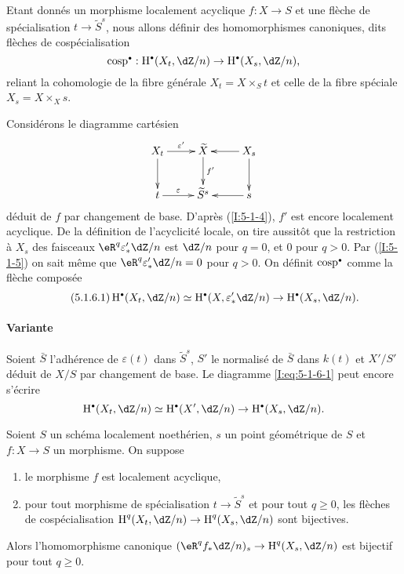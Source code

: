 \subsubsection{}\label{I:5-1-6}

Etant donnés un morphisme localement acyclique $f:X\to S$ et une flèche de 
spécialisation $t\to \widetilde S^s$, nous allons définir des 
homomorphismes canoniques, dits flèches de cospécialisation 
\[
  \cosp^\bullet : \h^\bullet(X_t,\dZ/n) \to \h^\bullet(X_s,\dZ/n)\text{,}
\]
reliant la cohomologie de la fibre générale $X_t=X\times_S t$ et celle de la 
fibre spéciale $X_s=X\times_X s$. 

Considérons le diagramme cartésien 
\[\xymatrix{
  X_t \ar[d] \ar[r]^-{\varepsilon'} 
    & \widetilde X \ar[d]^-{f'} 
    & \ar[l] X_s \ar[d] \\
  t \ar[r]^-\varepsilon 
    & \widetilde S^s 
    & \ar[l] s
}\]
déduit de $f$ par changement de base. D'après (\ref{I:5-1-4}), $f'$ est encore 
localement acyclique. De la définition de l'acyclicité locale, on tire 
aussitôt que la restriction à $X_s$ des faisceaux $\eR^q \varepsilon_*' \dZ/n$ 
est $\dZ/n$ pour $q=0$, et $0$ pour $q>0$. Par (\ref{I:5-1-5}) on sait même que 
$\eR^q \varepsilon_*'\dZ/n = 0$ pour $q>0$. On définit $\cosp^\bullet$ comme la 
flèche composée 
\begin{equation*}\tag{5.1.6.1}\label{I:eq:5-1-6-1}
  \h^\bullet(X_t,\dZ/n) \simeq \h^\bullet(X,\varepsilon_*' \dZ/n) \to \h^\bullet(X_s,\dZ/n) \text{.}
\end{equation*}

\paragraph{Variante}
Soient $\bar S$ l'adhérence de $\varepsilon(t)$ dans $\widetilde S^s$, $S'$ le 
normalisé de $\bar S$ dans $k(t)$ et $X'/S'$ déduit de $X/S$ par changement 
de base. Le diagramme \eqref{I:eq:5-1-6-1} peut encore s'écrire 
\[
  \h^\bullet(X_t,\dZ/n) \simeq \h^\bullet(X',\dZ/n) \to \h^\bullet(X_s,\dZ/n) \text{.}
\]





\begin{theorem}\label{I:5-1-7}
Soient $S$ un schéma localement noethérien, $s$ un point géométrique de 
$S$ et $f:X\to S$ un morphisme. On suppose 
\begin{enumerate}[\indent a)]
  \item le morphisme $f$ est localement acyclique, 
  \item pour tout morphisme de spécialisation $t\to \widetilde S^s$ et pour 
    tout $q\geqslant 0$, les flèches de cospécialisation 
    $\h^q(X_t,\dZ/n) \to \h^q(X_s,\dZ/n)$ sont bijectives.
\end{enumerate}

Alors l'homomorphisme canonique $(\eR^q f_*\dZ/n)_s\to \h^q(X_s,\dZ/n)$ est 
bijectif pour tout $q\geqslant 0$. 
\end{theorem}

